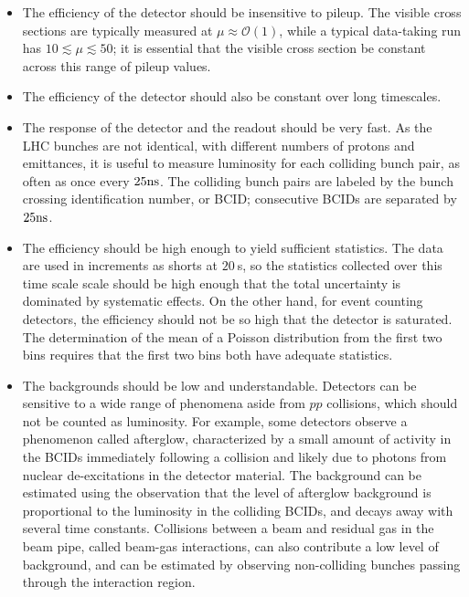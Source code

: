 \begin{itemize}
	\item The efficiency of the detector should be insensitive to pileup. The visible cross sections are typically measured at $\mu\approx \mathcal{O}(1)$, while a typical data-taking run has $10\lesssim\mu\lesssim50$; it is essential that the visible cross section be constant across this range of pileup values.
	\item The efficiency of the detector should also be constant over long timescales.
	\item The response of the detector and the readout should be very fast. As the LHC bunches are not identical, with different numbers of protons and emittances, it is useful to measure luminosity for each colliding bunch pair, as often as once every $25 \mathrm{ns}$. The colliding bunch pairs are labeled by the bunch crossing identification number, or BCID; consecutive BCIDs are separated by $25 \mathrm{ns}$. 
	\item The efficiency should be high enough to yield sufficient statistics. The data are used in increments as shorts at $20~$s, so the statistics collected over this time scale scale should be high enough that the total uncertainty is dominated by systematic effects. On the other hand, for event counting detectors, the efficiency should not be so high that the detector is saturated. The determination of the mean of a Poisson distribution from the first two bins requires that the first two bins both have adequate statistics. 
	\item The backgrounds should be low and understandable. Detectors can be sensitive to a wide range of phenomena aside from $pp$ collisions, which should not be counted as luminosity. For example, some detectors observe a phenomenon called afterglow, characterized by a small amount of activity in the BCIDs immediately following a collision and likely due to photons from nuclear de-excitations in the detector material. The background can be estimated using the observation that the level of afterglow background is proportional to the luminosity in the colliding BCIDs, and decays away with several time constants. Collisions between a beam and residual gas in the beam pipe, called beam-gas interactions, can also contribute a low level of background, and can be estimated by observing non-colliding bunches passing through the interaction region.
\end{itemize}


